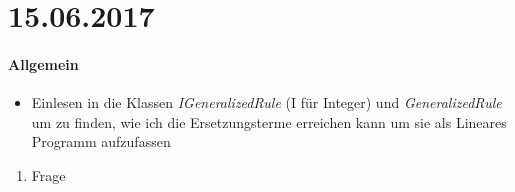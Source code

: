 \section*{15.06.2017}



\paragraph{Allgemein}
\begin{itemize}
	\item Einlesen in die Klassen \emph{IGeneralizedRule} (I für Integer) und \emph{GeneralizedRule} um zu finden, wie ich die Ersetzungsterme erreichen kann um sie als Lineares Programm aufzufassen
	
\end{itemize}

\begin{enumerate}
	\item Frage
\end{enumerate}